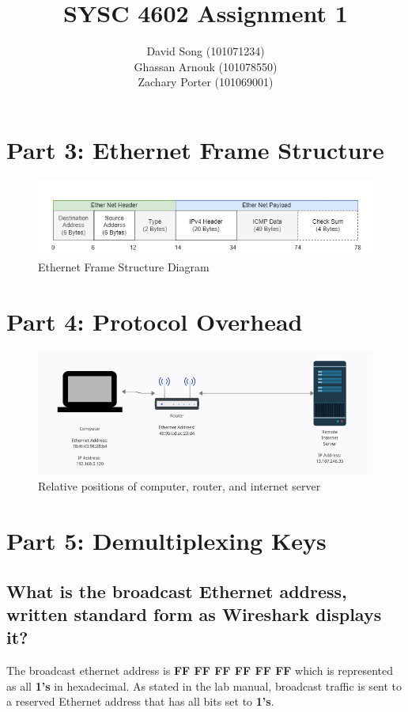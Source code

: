 \documentclass{article}
\begin{document}
    \title  { \textbf{SYSC 4602 Assignment 1} }
    \author {
        David Song (101071234)\\
        Ghassan Arnouk (101078550)\\
        Zachary Porter (101069001)
    }
     
    \maketitle
    
    \clearpage
    \section*{Part 3: Ethernet Frame Structure}
    \begin{figure}[htbp]
        \centering
        \includegraphics[width=\textwidth]{images/assignment3-part3.drawio.png}
        \caption{Ethernet Frame Structure Diagram}
    \end{figure}
    \section*{Part 4: Protocol Overhead}
    \begin{figure}[htbp]
        \centering
        \includegraphics[width=\linewidth]{images/part4.png}
        \caption{Relative positions of computer, router, and internet server}
    \end{figure}
    \section*{Part 5: Demultiplexing Keys}
    \subsection*{What is the broadcast Ethernet address, written standard form as Wireshark displays it?}
    The broadcast ethernet address is {\bfseries FF FF FF FF FF FF} which is represented as all {\bfseries 1's} in hexadecimal.
    As stated in the lab manual, broadcast traffic is sent to a reserved Ethernet address that has all bits set to {\bfseries 1's}.
    \clearpage
\end{document}
